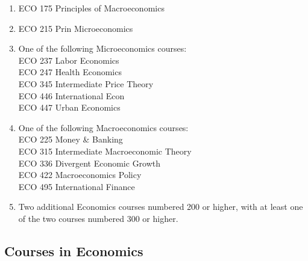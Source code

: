 \documentclass[
  letterpaper,
]{scrbook}
\providecommand{\tightlist}{%
  \setlength{\itemsep}{0pt}\setlength{\parskip}{0pt}}
\begin{document}
\begin{enumerate}
\def\labelenumi{\arabic{enumi}.}
\tightlist
\item
  ECO 175 Principles of Macroeconomics
\item
  ECO 215 Prin Microeconomics
\item
  One of the following Microeconomics courses:\\
  ECO 237 Labor Economics\\
  ECO 247 Health Economics\\
  ECO 345 Intermediate Price Theory\\
  ECO 446 International Econ\\
  ECO 447 Urban Economics\\
\item
  One of the following Macroeconomics courses:\\
  ECO 225 Money \& Banking\\
  ECO 315 Intermediate Macroeconomic Theory\\
  ECO 336 Divergent Economic Growth\\
  ECO 422 Macroeconomics Policy\\
  ECO 495 International Finance\\
\item
  Two additional Economics courses numbered 200 or higher, with at least
  one of the two courses numbered 300 or higher.
\end{enumerate}

\subsection{Courses in Economics}\label{courses-in-economics}
\end{document}
